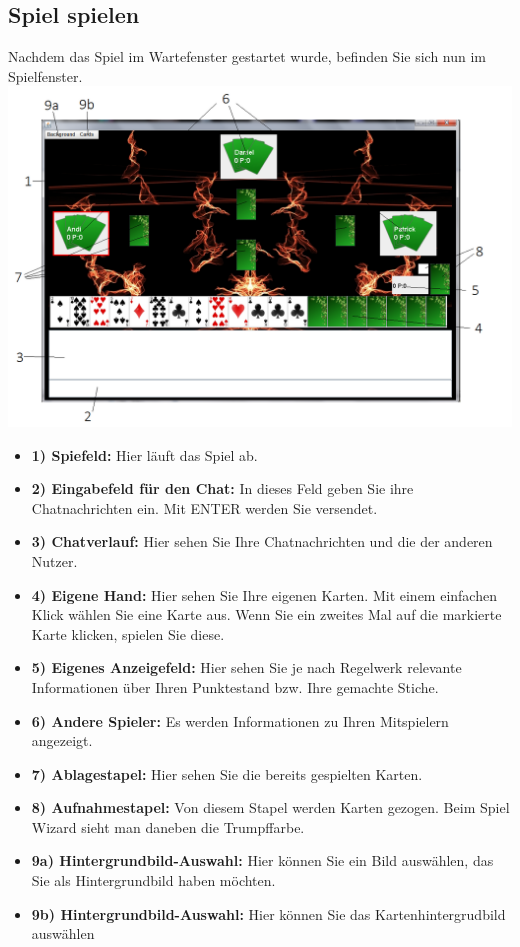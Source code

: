 \documentclass[titlepage,10pt,a4paper]{article}
\begin{document}
\subsection{Spiel spielen}

Nachdem das Spiel im \gls{Wartefenster} gestartet wurde, befinden Sie sich nun im Spielfenster.\\
\includegraphics[width=\textwidth]{Spiel-Fenster}
\begin{itemize}
	\item \textbf{1) Spiefeld:} Hier läuft das Spiel ab.
	\item \textbf{2) Eingabefeld für den Chat:} In dieses Feld geben Sie ihre Chatnachrichten ein. Mit ENTER werden Sie versendet.
	\item \textbf{3) Chatverlauf:} Hier sehen Sie Ihre Chatnachrichten und die der anderen Nutzer.
	\item \textbf{4) Eigene Hand:} Hier sehen Sie Ihre eigenen Karten. Mit einem einfachen Klick wählen Sie eine Karte aus. Wenn Sie ein zweites Mal auf die markierte Karte klicken, spielen Sie diese.
	\item \textbf{5) Eigenes Anzeigefeld:} Hier sehen Sie je nach Regelwerk relevante Informationen über Ihren Punktestand bzw. Ihre gemachte Stiche.
	\item \textbf{6) Andere Spieler:} Es werden Informationen zu Ihren Mitspielern angezeigt.
	\item \textbf{7) Ablagestapel:} Hier sehen Sie die bereits gespielten Karten.
	\item \textbf{8) Aufnahmestapel:} Von diesem Stapel werden Karten gezogen. Beim Spiel Wizard sieht man daneben die Trumpffarbe.
	\item \textbf{9a) Hintergrundbild-Auswahl:} Hier können Sie ein Bild auswählen, das Sie als Hintergrundbild haben möchten.
	\item \textbf{9b) Hintergrundbild-Auswahl:} Hier können Sie das  Kartenhintergrudbild auswählen
\end{itemize}
\end{document}
